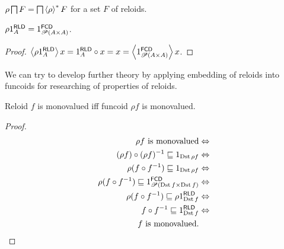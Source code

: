 \begin{conjecture}
$\rho\bigsqcap F=\bigsqcap\left\langle \rho\right\rangle ^{\ast}F$ for a set $F$ of reloids.\end{conjecture}
\begin{prop}
$\rho1_{A}^{\mathsf{RLD}}=1_{\mathscr{P}(A\times A)}^{\mathsf{FCD}}$.\end{prop}
\begin{proof}
$\left\langle \rho 1_{A}^{\mathsf{RLD}}\right\rangle x=1_{A}^{\mathsf{RLD}}\circ x=x=\left\langle 1_{\mathscr{P}(A\times A)}^{\mathsf{FCD}}\right\rangle x$.
\end{proof}
We can try to develop further theory by applying embedding of reloids
into funcoids for researching of properties of reloids.
\begin{thm}
Reloid $f$ is monovalued iff funcoid $\rho f$ is monovalued.\end{thm}
\begin{proof}
~
\begin{align*}
\rho f\text{ is monovalued} & \Leftrightarrow\\
(\rho f)\circ(\rho f)^{-1}\sqsubseteq1_{\operatorname{Dst}\rho f} & \Leftrightarrow\\
\rho(f\circ f^{-1})\sqsubseteq1_{\operatorname{Dst}\rho f} & \Leftrightarrow\\
\rho(f\circ f^{-1})\sqsubseteq1_{\mathscr{P}(\operatorname{Dst} f\times\operatorname{Dst} f)}^{\mathsf{FCD}} & \Leftrightarrow\\
\rho(f\circ f^{-1})\sqsubseteq\rho1_{\operatorname{Dst} f}^{\mathsf{RLD}} & \Leftrightarrow\\
f\circ f^{-1}\sqsubseteq1_{\operatorname{Dst} f}^{\mathsf{RLD}} & \Leftrightarrow\\
f\text{ is monovalued}.
\end{align*}
\end{proof}


